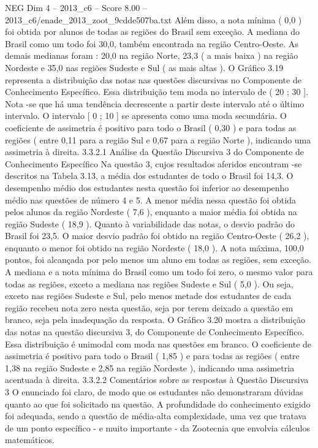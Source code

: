 \begin{textsample}{NEG Dim 4 – 2013\_c6 – Score 8.00 – 2013\_c6/enade\_2013\_zoot\_9cdde507ba.txt}
Além disso, a nota mínima ( 0,0 ) foi obtida por alunos de todas as regiões do Brasil sem exceção.
A mediana do Brasil como um todo foi 30,0, também encontrada na região Centro-Oeste.
As demais medianas foram : 20,0 na região Norte, 23,3 ( a mais baixa ) na região Nordeste e 35,0 nas regiões Sudeste e Sul ( as mais altas ).
O Gráfico 3.19 representa a distribuição das notas nas questões discursivas no Componente de Conhecimento Específico.
Essa distribuição tem moda no intervalo de ( 20 ; 30 ].
Nota -se que há uma tendência decrescente a partir deste intervalo até o último intervalo.
O intervalo [ 0 ; 10 ] se apresenta como uma moda secundária.
O coeficiente de assimetria é positivo para todo o Brasil ( 0,30 ) e para todas as regiões ( entre 0,11 para a região Sul e 0,67 para a região Norte ), indicando uma assimetria à direita. 3.3.2.1 Análise da Questão Discursiva 3 do Componente de Conhecimento Específico Na questão 3, cujos resultados aferidos encontram -se descritos na Tabela 3.13, a média dos estudantes de todo o Brasil foi 14,3.
O desempenho médio dos estudantes nesta questão foi inferior ao desempenho médio nas questões de número 4 e 5.
A menor média nessa questão foi obtida pelos alunos da região Nordeste ( 7,6 ), enquanto a maior média foi obtida na região Sudeste ( 18,9 ).
Quanto à variabilidade das notas, o desvio padrão do Brasil foi 23,5.
O maior desvio padrão foi obtido na região Centro-Oeste ( 26,2 ), enquanto o menor foi obtido na região Nordeste ( 18,0 ).
A nota máxima, 100,0 pontos, foi alcançada por pelo menos um aluno em todas as regiões, sem exceção.
A mediana e a nota mínima do Brasil como um todo foi zero, o mesmo valor para todas as regiões, exceto a mediana nas regiões Sudeste e Sul ( 5,0 ).
Ou seja, exceto nas regiões Sudeste e Sul, pelo menos metade dos estudantes de cada região recebeu nota zero nesta questão, seja por terem deixado a questão em branco, seja pela inadequação da resposta.
O Gráfico 3.20 mostra a distribuição das notas na questão discursiva 3, do Componente de Conhecimento Específico.
Essa distribuição é unimodal com moda nas questões em branco.
O coeficiente de assimetria é positivo para todo o Brasil ( 1,85 ) e para todas as regiões ( entre 1,38 na região Sudeste e 2,85 na região Nordeste ), indicando uma assimetria acentuada à direita. 3.3.2.2 Comentários sobre as respostas à Questão Discursiva 3 O enunciado foi claro, de modo que os estudantes não demonstraram dúvidas quanto ao que foi solicitado na questão.
A profundidade do conhecimento exigido foi adequada, sendo a questão de média-alta complexidade, uma vez que tratava de um ponto específico - e muito importante - da Zootecnia que envolvia cálculos matemáticos.

\end{textsample}
